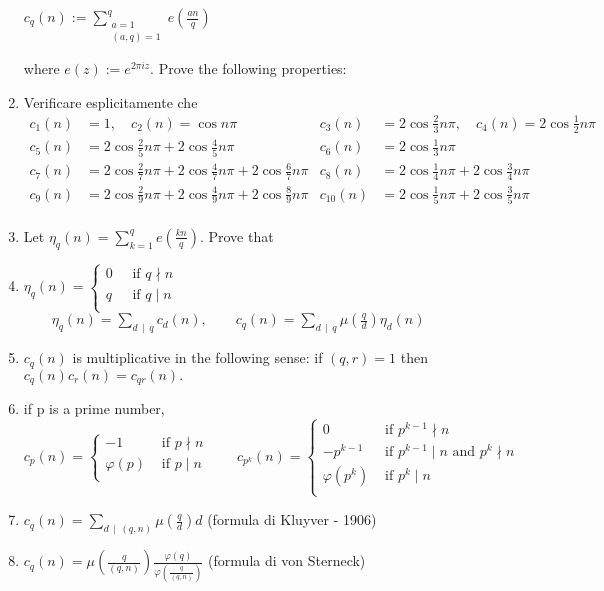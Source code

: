 \documentclass[a4paper,11pt]{article}
\begin{document}
\begin{enumerate}
\centerline{$c_q(n):=  \displaystyle\sum_{\substack{a=1\\ (a,q)=1}}^q e\left(\tfrac{an}{q}\right)$}
where $e(z):=e^{2\pi i z}$.
Prove the following properties:
 \item Verificare esplicitamente che
        \begin{align*} c_1(n) &= 1,\quad c_2(n) = \cos n\pi & 
                       c_3(n) &= 2\cos \tfrac23 n\pi, \quad c_4(n) = 2\cos \tfrac12 n\pi \\ 
                       c_5(n) &= 2\cos \tfrac25 n\pi + 2\cos \tfrac45 n\pi & c_6(n) &= 2\cos \tfrac13 n\pi \\ 
                       c_7(n) &= 2\cos \tfrac27 n\pi + 2\cos \tfrac47 n\pi + 2\cos \tfrac67 n\pi & c_8(n) &= 2\cos \tfrac14 n\pi + 2\cos \tfrac34 n\pi \\
                       c_9(n) &= 2\cos \tfrac29 n\pi + 2\cos \tfrac49 n\pi + 2\cos \tfrac89 n\pi & c_{10}(n)&= 2\cos \tfrac15 n\pi + 2\cos \tfrac35 n\pi \\ 
    \end{align*} \vspace*{-1cm}
\item[] Let $\eta_q(n) = \displaystyle\sum_{k=1}^q e(\frac{kn}q)$. Prove that 
\item $\eta_q(n) = \begin{cases} 0&\;\mbox{ if }q\nmid n\\ q&\;\mbox{ if }q\mid n\\ \end{cases} $
$\qquad\eta_q(n) =  \displaystyle\sum_{d\,\mid\, q} c_d(n),\qquad
c_q(n) = \displaystyle{\sum_{d\,\mid\,q} \mu\left(\frac{q}d\right)\eta_d(n)}$
\item  $c_q(n)$ is multiplicative in the following sense:
if $(q,r) = 1$  then $c_q(n)c_r(n)=c_{qr}(n).$
\item if p is a prime number,
$$ c_p(n) = \begin{cases} -1 &\mbox{ if }p\nmid n\\ \varphi(p)&\mbox{ if }p\mid n\\ \end{cases}\qquad
    c_{p^k}(n) = \begin{cases} 0 &\mbox{ if }p^{k-1}\nmid n\\ -p^{k-1} &\mbox{ if }p^{k-1}\mid n \mbox{ and }p^k\nmid n\\ 
    \varphi(p^k) &\mbox{ if }p^k\mid n\\ \end{cases}$$ 
\item $c_q(n)= \displaystyle\sum_{d\,\mid\,(q,n)}\mu\left(\frac{q}{d}\right) d$ (formula di Kluyver - 1906) 
        \item $c_q(n)= \mu\left(\frac{q}{(q, n)}\right)\frac{\varphi(q)}{\varphi\left(\frac{q}{(q, n)}\right)}$
         (formula di von Sterneck) 
 \end{enumerate} 
\end{document}
